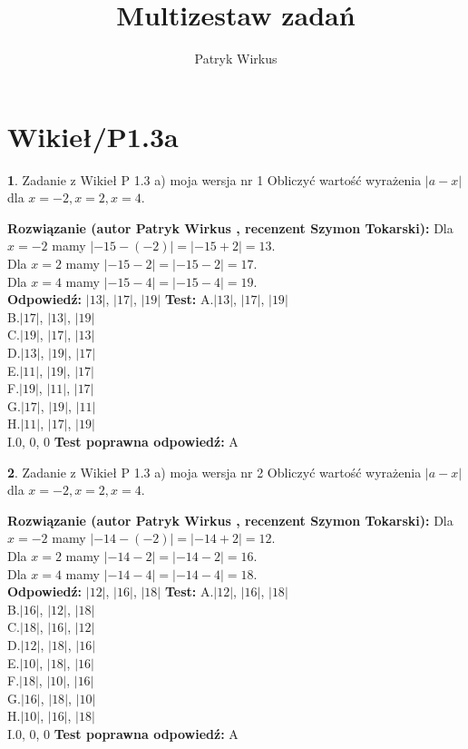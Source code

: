 \documentclass[12pt, a4paper]{article}
\title{Multizestaw zadań}
\author{Patryk Wirkus}
\date{}
\theoremstyle{definition} %
\newtheorem{zad}{}
\newcommand{\kategoria}[1]{\section{#1}}
\newcommand{\zadStart}[1]{\begin{zad}#1\newline}
\newcommand{\zadStop}{\end{zad}}
\newcommand{\rozwStart}[2]{\noindent \textbf{Rozwiązanie (autor #1 , recenzent #2): }\newline}
\newcommand{\rozwStop}{\newline}
\newcommand{\odpStart}{\noindent \textbf{Odpowiedź:}\newline}
\newcommand{\odpStop}{\newline}
\newcommand{\testStart}{\noindent \textbf{Test:}\newline}
\newcommand{\testStop}{\newline}
\newcommand{\kluczStart}{\noindent \textbf{Test poprawna odpowiedź:}\newline}
\newcommand{\kluczStop}{\newline}
\begin{document}
\maketitle

\kategoria{Wikieł/P1.3a}


\zadStart{Zadanie z Wikieł P 1.3 a) moja wersja nr 1}
Obliczyć wartość wyrażenia $|a - x|$ dla $x=-2,x=2,x=4$.
\zadStop
\rozwStart{Patryk Wirkus}{Szymon Tokarski}
Dla $x = -2$ mamy $|-15 - (-2)| = |-15 + 2| = 13$.\\
Dla $x = 2$ mamy $|-15 - 2| = |-15 - 2| = 17$.\\
Dla $x = 4$ mamy $|-15 - 4| = |-15 - 4| = 19$.\\
\rozwStop
\odpStart
$|13|$, $|17|$, $|19|$
\odpStop
\testStart
A.$|13|$, $|17|$, $|19|$\\
B.$|17|$, $|13|$, $|19|$\\
C.$|19|$, $|17|$, $|13|$\\
D.$|13|$, $|19|$, $|17|$\\
E.$|11|$, $|19|$, $|17|$\\
F.$|19|$, $|11|$, $|17|$\\
G.$|17|$, $|19|$, $|11|$\\
H.$|11|$, $|17|$, $|19|$\\
I.$0$, $0$, $0$
\testStop
\kluczStart
A
\kluczStop



\zadStart{Zadanie z Wikieł P 1.3 a) moja wersja nr 2}
Obliczyć wartość wyrażenia $|a - x|$ dla $x=-2,x=2,x=4$.
\zadStop
\rozwStart{Patryk Wirkus}{Szymon Tokarski}
Dla $x = -2$ mamy $|-14 - (-2)| = |-14 + 2| = 12$.\\
Dla $x = 2$ mamy $|-14 - 2| = |-14 - 2| = 16$.\\
Dla $x = 4$ mamy $|-14 - 4| = |-14 - 4| = 18$.\\
\rozwStop
\odpStart
$|12|$, $|16|$, $|18|$
\odpStop
\testStart
A.$|12|$, $|16|$, $|18|$\\
B.$|16|$, $|12|$, $|18|$\\
C.$|18|$, $|16|$, $|12|$\\
D.$|12|$, $|18|$, $|16|$\\
E.$|10|$, $|18|$, $|16|$\\
F.$|18|$, $|10|$, $|16|$\\
G.$|16|$, $|18|$, $|10|$\\
H.$|10|$, $|16|$, $|18|$\\
I.$0$, $0$, $0$
\testStop
\kluczStart
A
\kluczStop
\end{document}
